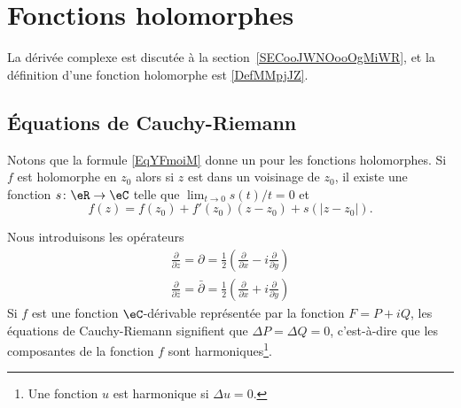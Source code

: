 
\section{Fonctions holomorphes}

La dérivée complexe est discutée à la section~\ref{SECooJWNOooOgMiWR}, et la définition d'une fonction holomorphe est \ref{DefMMpjJZ}.

\subsection{Équations de Cauchy-Riemann}

Notons que la formule \eqref{EqYFmoiM} donne un  pour les fonctions holomorphes. Si \( f\) est holomorphe en \( z_0\) alors si \( z\) est dans un voisinage de \( z_0\), il existe une fonction \( s\colon \eR\to \eC\) telle que \( \lim_{t\to 0} s(t)/t=0\) et
\begin{equation}    \label{EqptwBFG}
	f(z)=f(z_0)+f'(z_0)(z-z_0)+s(| z-z_0 |).
\end{equation}

Nous introduisons les opérateurs
\begin{subequations}
	\begin{align}
		\frac{ \partial  }{ \partial z }=\partial=\frac{ 1 }{2}\left( \frac{ \partial  }{ \partial x }-i\frac{ \partial  }{ \partial y } \right) \\
		\frac{ \partial  }{ \partial \bar z }=\bar\partial=\frac{ 1 }{2}\left( \frac{ \partial  }{ \partial x }+i\frac{ \partial  }{ \partial y } \right)
	\end{align}
\end{subequations}
Si \( f\) est une fonction \( \eC\)-dérivable représentée par la fonction \( F=P+iQ\), les équations de Cauchy-Riemann signifient que \( \Delta P=\Delta Q=0\), c'est-à-dire que les composantes de la fonction \( f\) sont harmoniques\footnote{Une fonction \( u\) est harmonique si \( \Delta u=0\).}.

